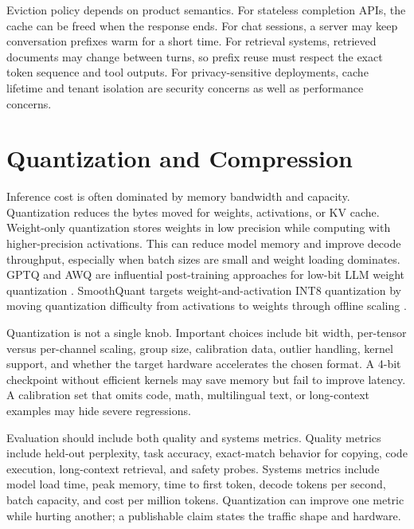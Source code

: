 Eviction policy depends on product semantics. For stateless completion APIs, the cache can be freed when the response ends. For chat sessions, a server may keep conversation prefixes warm for a short time. For retrieval systems, retrieved documents may change between turns, so prefix reuse must respect the exact token sequence and tool outputs. For privacy-sensitive deployments, cache lifetime and tenant isolation are security concerns as well as performance concerns.

\section{Quantization and Compression}
\label{sec:serving-quantization}

Inference cost is often dominated by memory bandwidth and capacity. Quantization reduces the bytes moved for weights, activations, or KV cache. Weight-only quantization stores weights in low precision while computing with higher-precision activations. This can reduce model memory and improve decode throughput, especially when batch sizes are small and weight loading dominates. GPTQ and AWQ are influential post-training approaches for low-bit LLM weight quantization \cite{frantar2022gptq,lin2023awq}. SmoothQuant targets weight-and-activation INT8 quantization by moving quantization difficulty from activations to weights through offline scaling \cite{xiao2023smoothquant}.

Quantization is not a single knob. Important choices include bit width, per-tensor versus per-channel scaling, group size, calibration data, outlier handling, kernel support, and whether the target hardware accelerates the chosen format. A 4-bit checkpoint without efficient kernels may save memory but fail to improve latency. A calibration set that omits code, math, multilingual text, or long-context examples may hide severe regressions.

Evaluation should include both quality and systems metrics. Quality metrics include held-out perplexity, task accuracy, exact-match behavior for copying, code execution, long-context retrieval, and safety probes. Systems metrics include model load time, peak memory, time to first token, decode tokens per second, batch capacity, and cost per million tokens. Quantization can improve one metric while hurting another; a publishable claim states the traffic shape and hardware.


